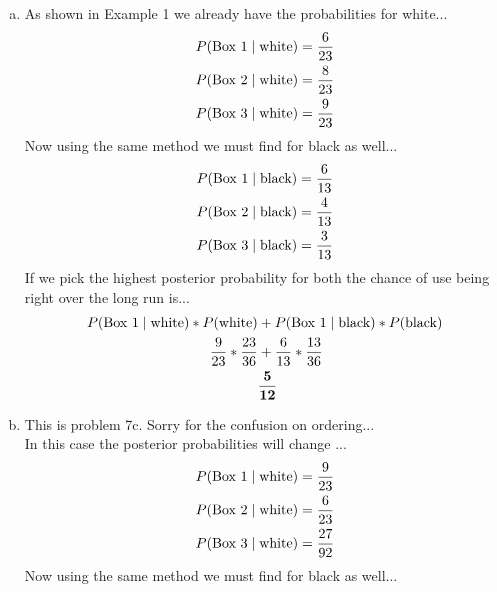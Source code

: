 \documentclass[10pt]{report}
\begin{document}
\subsection{}
 \begin{enumerate}[(a)]
 \item As shown in Example 1 we already have the probabilities for white...\ \\
 \begin{align*}
 P(\textnormal{Box 1} \mid \textnormal{white}) &= \frac{6}{23} \\
P(\textnormal{Box 2} \mid \textnormal{white}) &= \frac{8}{23} \\
P(\textnormal{Box 3} \mid \textnormal{white}) &= \frac{9}{23} \\
 \end{align*}
 Now using the same method we must find for black as well... \ \\
  \begin{align*}
 P(\textnormal{Box 1} \mid \textnormal{black}) &= \frac{6}{13} \\
P(\textnormal{Box 2} \mid \textnormal{black}) &= \frac{4}{13} \\
P(\textnormal{Box 3} \mid \textnormal{black}) &= \frac{3}{13} \\
 \end{align*}
 If we pick the highest posterior probability for both the chance of use being right over the long run is...\ \\
   \begin{align*}
  P(\textnormal{Box 1} \mid \textnormal{white}) * P(\textnormal{white})&+ P(\textnormal{Box 1} \mid \textnormal{black}) * P(\textnormal{black})  \\
\frac{9}{23} * \frac{23}{36} &+ \frac{6}{13} * \frac{13}{36} \\
&\mathbf{\frac{5}{12}}
 \end{align*}
\item This is problem 7c. Sorry for the confusion on ordering...\ \\
In this case the posterior probabilities will change ...
 \begin{align*}
 P(\textnormal{Box 1} \mid \textnormal{white}) &= \frac{9}{23} \\
P(\textnormal{Box 2} \mid \textnormal{white}) &= \frac{6}{23} \\
P(\textnormal{Box 3} \mid \textnormal{white}) &= \frac{27}{92} \\
 \end{align*}
 Now using the same method we must find for black as well... \ \\

\end{enumerate}
\end{document}
